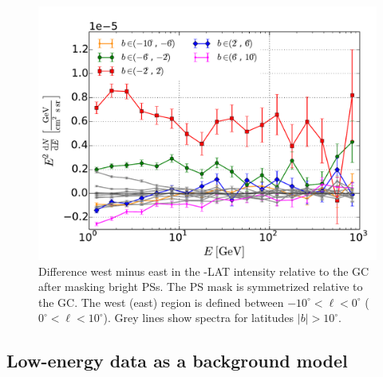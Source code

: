 \begin{figure}[h]
\hspace{-2mm}
 \includegraphics[width=\onepic\textwidth]{plots/Difference_data_for_different_latitudes.pdf}
 \caption{Difference west minus east in the \Fermi-LAT intensity relative to the GC after masking bright PSs.
 The PS mask is symmetrized relative to the GC.
 The west (east) region is defined between $-10^\circ < \ell <0^\circ$ ($0^\circ < \ell <10^\circ$).
 Grey lines show spectra for latitudes $|b| > 10^\circ$. 
 }
 \label{fig:data_diff}
\end{figure}

\subsection{Low-energy data as a background model}
\label{sec:le_data_model}

